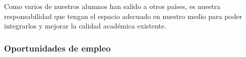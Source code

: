 Como varios de nuestros alumnos han salido a otros paí­ses, es nuestra responsabilidad que tengan el 
espacio adecuado en nuestro medio para poder integrarlos y mejorar la calidad académica existente.

\subsubsection{Oportunidades de empleo}



